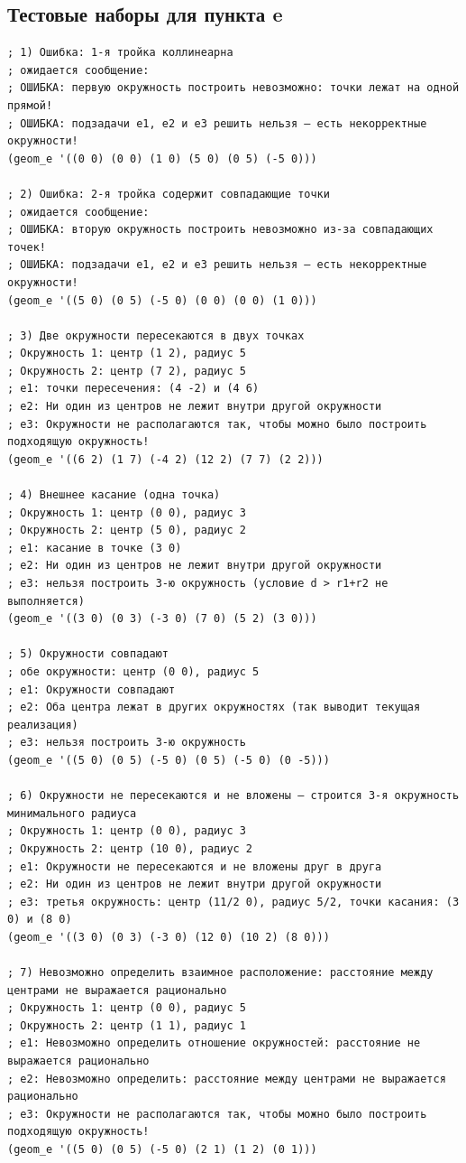 \documentclass[a4paper, 11pt]{article}
\begin{document}
\subsection*{Тестовые наборы для пункта e}
\begin{lstlisting}
; 1) Ошибка: 1-я тройка коллинеарна
; ожидается сообщение:
; ОШИБКА: первую окружность построить невозможно: точки лежат на одной прямой!
; ОШИБКА: подзадачи e1, e2 и e3 решить нельзя — есть некорректные окружности!
(geom_e '((0 0) (0 0) (1 0) (5 0) (0 5) (-5 0)))

; 2) Ошибка: 2-я тройка содержит совпадающие точки
; ожидается сообщение:
; ОШИБКА: вторую окружность построить невозможно из-за совпадающих точек!
; ОШИБКА: подзадачи e1, e2 и e3 решить нельзя — есть некорректные окружности!
(geom_e '((5 0) (0 5) (-5 0) (0 0) (0 0) (1 0)))

; 3) Две окружности пересекаются в двух точках
; Окружность 1: центр (1 2), радиус 5
; Окружность 2: центр (7 2), радиус 5
; e1: точки пересечения: (4 -2) и (4 6)
; e2: Ни один из центров не лежит внутри другой окружности
; e3: Окружности не располагаются так, чтобы можно было построить подходящую окружность!
(geom_e '((6 2) (1 7) (-4 2) (12 2) (7 7) (2 2)))

; 4) Внешнее касание (одна точка)
; Окружность 1: центр (0 0), радиус 3
; Окружность 2: центр (5 0), радиус 2
; e1: касание в точке (3 0)
; e2: Ни один из центров не лежит внутри другой окружности
; e3: нельзя построить 3-ю окружность (условие d > r1+r2 не выполняется)
(geom_e '((3 0) (0 3) (-3 0) (7 0) (5 2) (3 0)))

; 5) Окружности совпадают
; обе окружности: центр (0 0), радиус 5
; e1: Окружности совпадают
; e2: Оба центра лежат в других окружностях (так выводит текущая реализация)
; e3: нельзя построить 3-ю окружность
(geom_e '((5 0) (0 5) (-5 0) (0 5) (-5 0) (0 -5)))

; 6) Окружности не пересекаются и не вложены — строится 3-я окружность минимального радиуса
; Окружность 1: центр (0 0), радиус 3
; Окружность 2: центр (10 0), радиус 2
; e1: Окружности не пересекаются и не вложены друг в друга
; e2: Ни один из центров не лежит внутри другой окружности
; e3: третья окружность: центр (11/2 0), радиус 5/2, точки касания: (3 0) и (8 0)
(geom_e '((3 0) (0 3) (-3 0) (12 0) (10 2) (8 0)))

; 7) Невозможно определить взаимное расположение: расстояние между центрами не выражается рационально
; Окружность 1: центр (0 0), радиус 5
; Окружность 2: центр (1 1), радиус 1
; e1: Невозможно определить отношение окружностей: расстояние не выражается рационально
; e2: Невозможно определить: расстояние между центрами не выражается рационально
; e3: Окружности не располагаются так, чтобы можно было построить подходящую окружность!
(geom_e '((5 0) (0 5) (-5 0) (2 1) (1 2) (0 1)))
\end{lstlisting}
\end{document}
